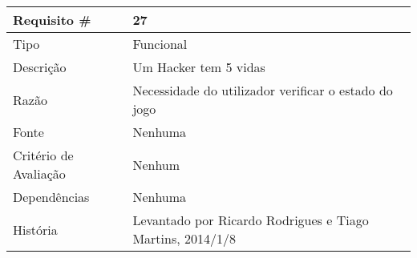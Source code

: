 \begin{tabular} {|l|p{8cm}|} 
\hline
Requisito \# & 27 \\
\hline
Tipo & Funcional \\
\hline
Descrição & Um Hacker tem 5 vidas \\
\hline
Razão & Necessidade do utilizador verificar o estado do jogo \\
\hline
Fonte & Nenhuma \\
\hline
Critério de Avaliação & Nenhum \\
\hline
Dependências & Nenhuma \\
\hline
História & Levantado por Ricardo Rodrigues e Tiago Martins, 2014/1/8 \\
\hline
\end{tabular}